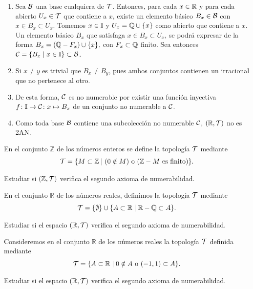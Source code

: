 \begin{ex}
    \begin{enumerate}[topsep=5pt, itemsep=0pt]
        \item Sea $\mathcal{B}$ una base cualquiera de $\mathcal{T}$. Entonces, para cada $x \in \mathbb{R}$ y para cada abierto $U_x \in \mathcal{T}$ que contiene a $x$, existe un elemento básico $B_x\in\mathcal{B}$ con $x\in B_x \subset U_x$. Tomemos $x\in \mathbb{I}$ y $U_x = \mathbb{Q} \cup \{x\}$ como abierto que contiene a $x$. Un elemento básico $B_x$ que satisfaga $x\in B_x \subset U_x$, se podrá expresar de la forma $B_x = (\mathbb{Q} - F_x) \cup \{x\}$, con $F_x\subset\mathbb{Q}$ finito. Sea entonces $\mathcal{C} = \{B_x \mid x\in  \mathbb{I}\} \subset \mathcal{B}$.
        \item Si $x\neq y$ es trivial que $B_x \neq B_y$, pues ambos conjuntos contienen un irracional que no pertenece al otro.
        \item De esta forma, $\mathcal{C}$ es no numerable por existir una función inyectiva $f\colon \mathbb{I}\to\mathcal{C} \colon x \mapsto B_x$ de un conjunto no numerable a $\mathcal{C}$.
        \item Como toda base $\mathcal{B}$ contiene una subcolección no numerable $\mathcal{C}$, $(\mathbb{R},\mathcal{T})$ no es 2AN.
    \end{enumerate}
\end{ex}

\begin{ex}
    \hypertarget{2025 A 2}{}
    En el conjunto \(\mathbb{Z}\) de los números enteros se define la topología \(\mathcal{T}\) mediante
    \[
        \mathcal{T} = \{M \subset \mathbb{Z} \mid (0 \notin M) \text{ o } (\mathbb{Z} - M \text{ es finito})\}.
    \]

    Estudiar si \((\mathbb{Z},\mathcal{T})\)  verifica el segundo axioma de numerabilidad.
\end{ex}

\begin{ex}
    \hypertarget{2026 A 3}{}
    En el conjunto \(\mathbb{R}\) de los números reales, definimos la topología \(\mathcal{T}\) mediante \[\mathcal{T} = \{\emptyset\} \cup \{A \subset \mathbb{R} \mid \mathbb{R} - \mathbb{Q} \subset A\}.\]

    Estudiar si el espacio \((\mathbb{R}, \mathcal{T})\) verifica el segundo axioma de numerabilidad.

\end{ex}

\begin{ex}
    \hypertarget{2026 B 3}{}
    Consideremos en el conjunto \(\mathbb{R}\) de los números reales la topología \(\mathcal{T}\) definida mediante \[\mathcal{T} = \{A \subset \mathbb{R} \mid 0 \notin A \text{ o } (-1, 1) \subset A\}.\]

    Estudiar si el espacio \((\mathbb{R}, \mathcal{T})\) verifica el segundo axioma de numerabilidad.

\end{ex}

